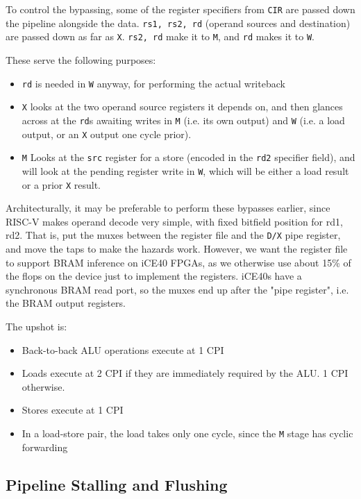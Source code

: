 \documentclass{article}
\begin{document}
To control the bypassing, some of the register specifiers from \texttt{CIR} are passed down the pipeline alongside the data. \texttt{rs1, rs2, rd} (operand sources and destination) are passed down as far as \texttt{X}. \texttt{rs2, rd} make it to \texttt{M}, and \texttt{rd} makes it to \texttt{W}.

These serve the following purposes:

\begin{itemize}
	\item \texttt{rd} is needed in \texttt{W} anyway, for performing the actual writeback
	\item \texttt{X} looks at the two operand source registers it depends on, and then glances across at the \texttt{rd}s awaiting writes in \texttt{M} (i.e. its own output) and \texttt{W} (i.e. a load output, or an \texttt{X} output one cycle prior).
	\item \texttt{M} Looks at the \texttt{src} register for a store (encoded in the \texttt{rd2} specifier field), and will look at the pending register write in \texttt{W}, which will be either a load result or a prior \texttt{X} result.
\end{itemize}

Architecturally, it may be preferable to perform these bypasses earlier, since RISC-V makes operand decode very simple, with fixed bitfield position for rd1, rd2. That is, put the muxes between the register file and the \texttt{D/X} pipe register, and move the taps to make the hazards work. However, we want the register file to support BRAM inference on iCE40 FPGAs, as we otherwise use about 15\% of the flops on the device just to implement the registers. iCE40s have a synchronous BRAM read port, so the muxes end up after the "pipe register", i.e. the BRAM output registers.

The upshot is:

\begin{itemize}
	\item Back-to-back ALU operations execute at 1 CPI
	\item Loads execute at 2 CPI if they are immediately required by the ALU. 1 CPI otherwise.
	\item Stores execute at 1 CPI
	\item In a load-store pair, the load takes only one cycle, since the \texttt{M} stage has cyclic forwarding
\end{itemize}

\subsection{Pipeline Stalling and Flushing}
\label{section:stalling_flushing}
\end{document}

